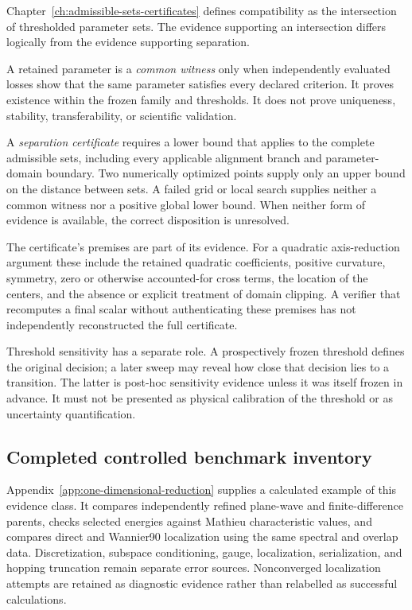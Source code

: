 Chapter~\ref{ch:admissible-sets-certificates} defines compatibility as the
intersection of thresholded parameter sets. The evidence supporting an
intersection differs logically from the evidence supporting separation.

A retained parameter is a \emph{common witness} only when independently
evaluated losses show that the same parameter satisfies every declared
criterion. It proves existence within the frozen family and thresholds. It does
not prove uniqueness, stability, transferability, or scientific validation.

A \emph{separation certificate} requires a lower bound that applies to the
complete admissible sets, including every applicable alignment branch and
parameter-domain boundary. Two numerically optimized points supply only an
upper bound on the distance between sets. A failed grid or local search supplies
neither a common witness nor a positive global lower bound. When neither form
of evidence is available, the correct disposition is unresolved.

The certificate's premises are part of its evidence. For a quadratic
axis-reduction argument these include the retained quadratic coefficients,
positive curvature, symmetry, zero or otherwise accounted-for cross terms,
the location of the centers, and the absence or explicit treatment of domain
clipping. A verifier that recomputes a final scalar without authenticating
these premises has not independently reconstructed the full certificate.

Threshold sensitivity has a separate role. A prospectively frozen threshold
defines the original decision; a later sweep may reveal how close that decision
lies to a transition. The latter is post-hoc sensitivity evidence unless it was
itself frozen in advance. It must not be presented as physical calibration of
the threshold or as uncertainty quantification.

\subsection{Completed controlled benchmark inventory}


Appendix~\ref{app:one-dimensional-reduction} supplies a calculated example of
this evidence class. It compares independently refined plane-wave and
finite-difference parents, checks selected energies against Mathieu
characteristic values, and compares direct and Wannier90 localization using the
same spectral and overlap data. Discretization, subspace conditioning, gauge,
localization, serialization, and hopping truncation remain separate error
sources. Nonconverged localization attempts are retained as diagnostic evidence
rather than relabelled as successful calculations.

